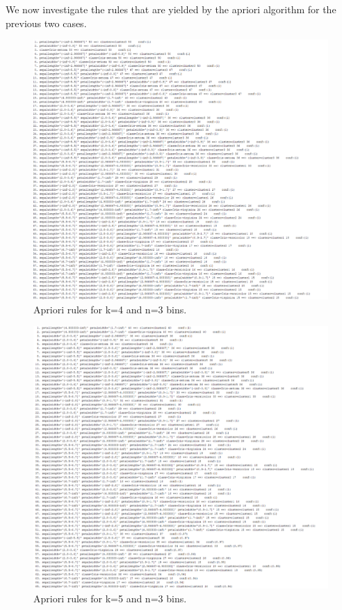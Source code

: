 \documentclass[letterpaper,12pt]{article}
\begin{document}
We now investigate the rules that are yielded by the apriori algorithm for the previous two cases.


\begin{figure}[H] 
  \centering
      \includegraphics[width=0.8\columnwidth]{3bins_4cl_apriori_rules}
        \caption{
                \label{fig:3bins_4cl_apriori}  
                Apriori rules for k=4 and n=3 bins.
        }
\end{figure}


\begin{figure}[H] 
  \centering
      \includegraphics[width=0.8\columnwidth]{3bins_5cl_apriori_rules}
        \caption{
                \label{fig:3bins_5cl_apriori}  
                Apriori rules for k=5 and n=3 bins.
        }
\end{figure}
\end{document}

